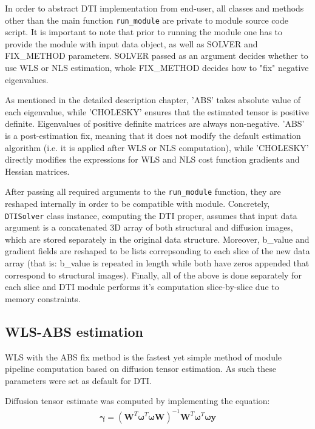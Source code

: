 In order to abstract DTI implementation from end-user, all classes and methods other than the main function \texttt{run\_module} are private to module source code script. It is important to note that prior to running the module one has to provide the module with input data object, as well as SOLVER and FIX\_METHOD parameters. SOLVER passed as an argument decides whether to use WLS or NLS estimation, whole FIX\_METHOD decides how to "fix" negative eigenvalues. 

As mentioned in the detailed description chapter, 'ABS' takes absolute value of each eigenvalue, while 'CHOLESKY' ensures that the estimated tensor is positive definite. Eigenvalues of positive definite matrices are always non-negative. 'ABS' is a post-estimation fix, meaning that it does not modify the default estimation algorithm (i.e. it is applied after WLS or NLS computation), while 'CHOLESKY' directly modifies the expressions for WLS and NLS cost function gradients and Hessian matrices.

After passing all required arguments to the \texttt{run\_module} function, they are reshaped internally in order to be compatible with module. Concretely, \texttt{DTISolver} class instance, computing the DTI proper, assumes that input data argument is a concatenated 3D array of both structural and diffusion images, which are stored separately in the original data structure. Moreover, b\_value and gradient fields are reshaped to be lists correpsonding to each slice of the new data array (that is: b\_value is repeated in length while both have zeros appended that correspond to structural images). Finally, all of the above is done separately for each slice and DTI module performs it's computation slice-by-slice due to memory constraints.

\subsection{WLS-ABS estimation}

WLS with the ABS fix method is the fastest yet simple method of module pipeline computation based on diffusion tensor estimation. As such these parameters were set as default for DTI.

Diffusion tensor estimate was computed by implementing the equation:
\begin{equation}
\begin{aligned}
\boldsymbol{\gamma}=\left(\boldsymbol{W}^T\boldsymbol{\omega}^T\boldsymbol{\omega}\boldsymbol{W}\right)^{-1}\boldsymbol{W}^T\boldsymbol{\omega}^T\boldsymbol{\omega y}
\end{aligned}
\label{Eq:m6_impl_eq_1}
\end{equation}

